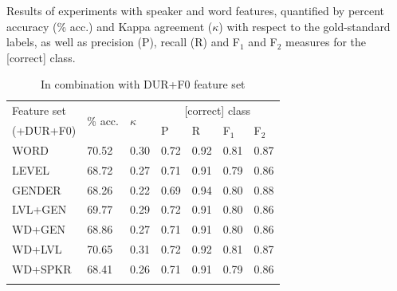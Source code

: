 		
		
		\begin{table}[tb]
			\centering
			\caption[Results of experiments with speaker and word features]{Results of experiments with speaker and word features,
			quantified by percent accuracy (\% acc.) and Kappa agreement ($\kappa$) with respect to the gold-standard labels, as well as precision (P), recall (R) and F$_1$ and F$_2$ measures for the [correct] class. 
			}
			
					\begin{subtable}{\textwidth}
			\centering
			\caption{In combination with DUR+F0 feature set}
			\begin{tabularx}{.8\textwidth}{lXXXXXX}		
			\toprule
			Feature set & \multirow{2}{*}{\% acc.} & \multirow{2}{*}{$\kappa$} & \multicolumn{4}{c}{[correct] class} \\
			 \cmidrule(lr){4-7}
			(+DUR+F0)& & & P & R & F$_1$ & F$_2$ \\
			\midrule
WORD	&	70.52	&	0.30	&	0.72	&	0.92	&	0.81	&	0.87	\\
LEVEL	&	68.72	&	0.27	&	0.71	&	0.91	&	0.79	&	0.86	\\
GENDER	&	68.26	&	0.22	&	0.69	&	0.94	&	0.80	&	0.88	\\
\addlinespace											
LVL+GEN	&	69.77	&	0.29	&	0.72	&	0.91	&	0.80	&	0.86	\\
WD+GEN	&	68.86	&	0.27	&	0.71	&	0.91	&	0.80	&	0.86	\\
WD+LVL	&	70.65	&	0.31	&	0.72	&	0.92	&	0.81	&	0.87	\\
\addlinespace											
WD+SPKR	&	68.41	&	0.26	&	0.71	&	0.91	&	0.79	&	0.86	\\
			\bottomrule
			\label{tab:results:spkrword:durF0}
			\end{tabularx}
		\end{subtable}
			

\end{table}

